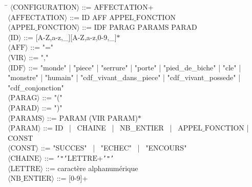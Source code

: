 \documentclass[a4paper, 12pt]{report}
\begin{document}
\begin{flushleft}
	\begin{tabbing}
		\hspace{4.2cm} \= \kill %
		$\langle \text{CONFIGURATION} \rangle$ \> ::= $\text{AFFECTATION}$+ \\
		$\langle \text{AFFECTATION} \rangle$ \> ::= ID AFF $\text{APPEL\_FONCTION}$ \\
		$\langle \text{APPEL\_FONCTION} \rangle$ \> ::= IDF PARAG $\text{PARAMS}$ PARAD \\
		$\langle \text{ID} \rangle$ \> ::= [A-Z,a-z,\_][A-Z,a-z,0-9,\_]$\ast$ \\
		$\langle \text{AFF} \rangle$ \> ::= "=" \\
		$\langle \text{VIR} \rangle$ \> ::= "," \\
		$\langle \text{IDF} \rangle$ \> ::= "monde" | "piece" | "serrure" | "porte" | "pied\_de\_biche" | "cle" | \\ "monstre" | "humain" |
		"cdf\_vivant\_dans\_piece" | "cdf\_vivant\_possede" | "cdf\_conjonction" \\
		$\langle \text{PARAG} \rangle$ \> ::= "(" \\
		$\langle \text{PARAD} \rangle$ \> ::= ")" \\
		$\langle \text{PARAMS} \rangle$ \> ::= $\text{PARAM}$ ($\text{VIR}$ $\text{PARAM}$)$\ast$ \\
		$\langle \text{PARAM} \rangle$ \> ::= ID \ | \ CHAINE \ | \ NB\_ENTIER \ | \ $\text{APPEL\_FONCTION}$ | CONST \\
		$\langle \text{CONST} \rangle$ \> ::= "SUCCES" \ | \ "ECHEC" \ | \ "ENCOURS" \\
		$\langle \text{CHAINE} \rangle$ \> ::= \texttt{'"'}$\text{LETTRE}$+\texttt{'"'} \\
		$\langle \text{LETTRE} \rangle$ \> ::= caractère alphanumérique \\
		$\langle \text{NB\_ENTIER} \rangle$ \> ::= [0-9]+
	\end{tabbing}
\end{flushleft}
\end{document}
